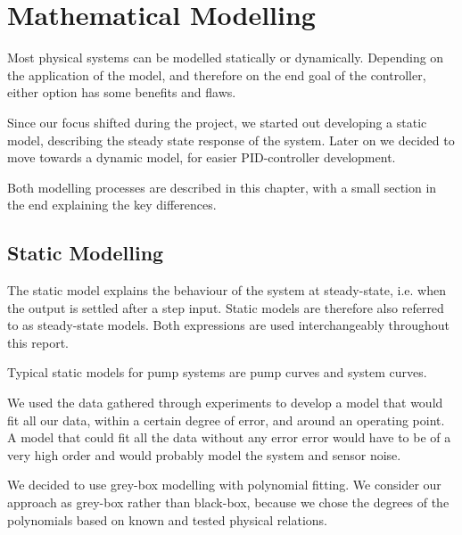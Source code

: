 \chapter{Mathematical Modelling}\label{ch:mathmodel}
Most physical systems can be modelled statically or dynamically.
Depending on the application of the model,
and therefore on the end goal of the controller,
either option has some benefits and flaws.

Since our focus shifted during the project, we started out developing a static model,
describing the steady state response of the system.
Later on we decided to move towards a dynamic model, for easier PID-controller development.

Both modelling processes are described in this chapter,
with a small section in the end explaining the key differences.
\section{Static Modelling}\label{sec:statmod}

The static model explains the behaviour of the system at steady-state,
i.e. when the output is settled after a step input.
Static models are therefore also referred to as steady-state models.
Both expressions are used interchangeably throughout this report.

Typical static models for pump systems are pump curves and system curves.

\newpage
We used the data gathered through experiments to develop a model that would fit all our data,
within a certain degree of error,
and around an operating point.
A model that could fit all the data without any error error would have to be of a very high order
and would probably model the system and sensor noise.

We decided to use grey-box modelling with polynomial fitting.
We consider our approach as grey-box rather than black-box,
because we chose the degrees of the polynomials based on known and tested physical relations.

